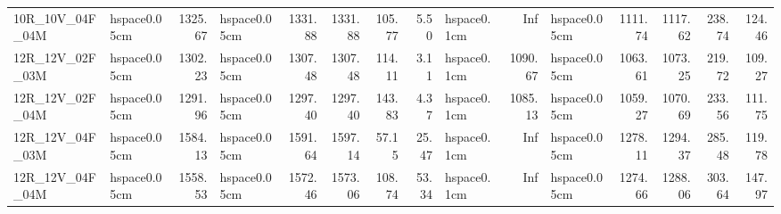 \begin{tabular}{llrlrrrrlrlrrrr}
10R_10V_04F_04M & hspace{0.05cm} & 1325.67 & hspace{0.05cm} & 1331.88 & 1331.88 & 105.77 & 5.50 & hspace{0.1cm} & Inf & hspace{0.05cm} & 1111.74 & 1117.62 & 238.74 & 124.46\\
\addlinespace
12R_12V_02F_03M & hspace{0.05cm} & 1302.23 & hspace{0.05cm} & 1307.48 & 1307.48 & 114.11 & 3.11 & hspace{0.1cm} & 1090.67 & hspace{0.05cm} & 1063.61 & 1073.25 & 219.72 & 109.27\\
12R_12V_02F_04M & hspace{0.05cm} & 1291.96 & hspace{0.05cm} & 1297.40 & 1297.40 & 143.83 & 4.37 & hspace{0.1cm} & 1085.13 & hspace{0.05cm} & 1059.27 & 1070.69 & 233.56 & 111.75\\
12R_12V_04F_03M & hspace{0.05cm} & 1584.13 & hspace{0.05cm} & 1591.64 & 1597.14 & 57.15 & 25.47 & hspace{0.1cm} & Inf & hspace{0.05cm} & 1278.11 & 1294.37 & 285.48 & 119.78\\
12R_12V_04F_04M & hspace{0.05cm} & 1558.53 & hspace{0.05cm} & 1572.46 & 1573.06 & 108.74 & 53.34 & hspace{0.1cm} & Inf & hspace{0.05cm} & 1274.66 & 1288.06 & 303.64 & 147.97\\
\bottomrule
\end{tabular}
